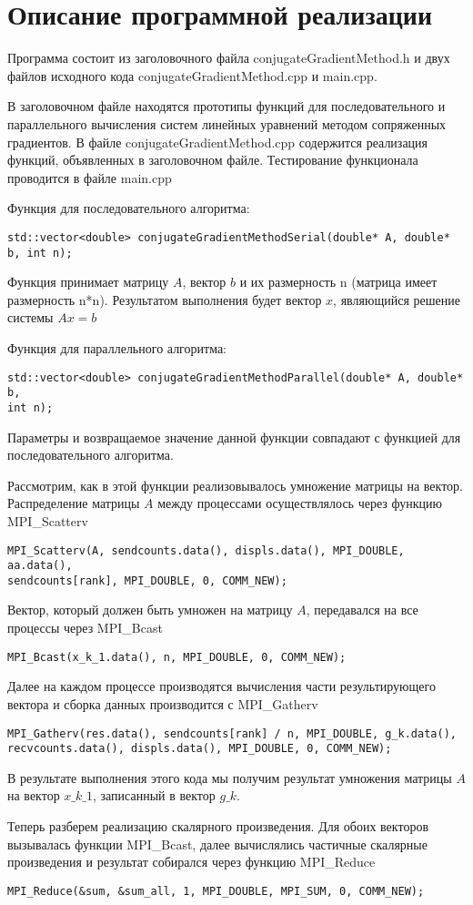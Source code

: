 \documentclass{report}
\begin{document}
\section*{Описание программной реализации}
Программа состоит из заголовочного файла conjugateGradientMethod.h и двух файлов исходного кода conjugateGradientMethod.cpp и main.cpp.
\par В заголовочном файле находятся прототипы функций для последовательного и параллельного вычисления систем линейных уравнений методом сопряженных градиентов. В файле conjugateGradientMethod.cpp содержится реализация функций, объявленных в заголовочном файле. Тестирование функционала проводится в файле main.cpp
\par Функция для последовательного алгоритма:
\begin{lstlisting}
std::vector<double> conjugateGradientMethodSerial(double* A, double* b, int n);
\end{lstlisting}
Функция принимает матрицу $A$, вектор $b$ и их размерность n (матрица имеет размерность n*n). Результатом выполнения будет вектор $x$, являющийся решение системы $Ax = b$
\par Функция для параллельного
алгоритма:
\begin{lstlisting}
std::vector<double> conjugateGradientMethodParallel(double* A, double* b,
int n); 
\end{lstlisting}
Параметры и возвращаемое значение данной функции совпадают с функцией для последовательного алгоритма.
\par Рассмотрим, как в этой функции реализовывалось умножение матрицы на вектор. Распределение матрицы $A$ между процессами осуществлялось через функцию MPI\_Scatterv
\begin{lstlisting}
MPI_Scatterv(A, sendcounts.data(), displs.data(), MPI_DOUBLE, aa.data(),
sendcounts[rank], MPI_DOUBLE, 0, COMM_NEW);
\end{lstlisting}
Вектор, который должен быть умножен на матрицу $A$, передавался на все процессы через MPI\_Bcast
\begin{lstlisting}
MPI_Bcast(x_k_1.data(), n, MPI_DOUBLE, 0, COMM_NEW);
\end{lstlisting}
Далее на каждом процессе производятся вычисления части результирующего вектора и сборка данных производится с MPI\_Gatherv
\begin{lstlisting}
MPI_Gatherv(res.data(), sendcounts[rank] / n, MPI_DOUBLE, g_k.data(),
recvcounts.data(), displs.data(), MPI_DOUBLE, 0, COMM_NEW);
\end{lstlisting}
В результате выполнения этого кода мы получим результат умножения матрицы $A$ на вектор $x\_k\_1$, записанный в вектор $g\_k$.
\par Теперь разберем реализацию скалярного произведения. Для обоих векторов вызывалась функции MPI\_Bcast, далее вычислялись частичные скалярные произведения и результат собирался через функцию MPI\_Reduce
\begin{lstlisting}
MPI_Reduce(&sum, &sum_all, 1, MPI_DOUBLE, MPI_SUM, 0, COMM_NEW);
\end{lstlisting}
\newpage
\end{document}
